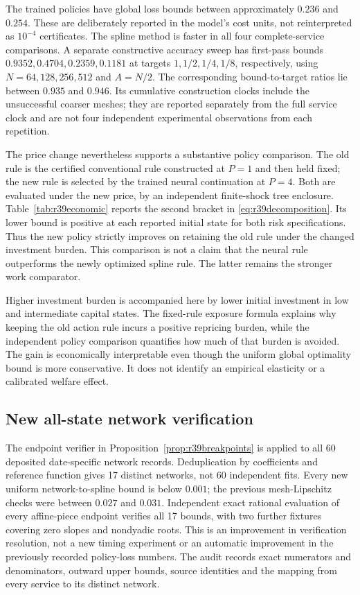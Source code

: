 

The trained policies have global loss bounds between approximately $0.236$ and
$0.254$. These are deliberately reported in the model's cost units, not
reinterpreted as $10^{-4}$ certificates. The spline method is faster in all
four complete-service comparisons. A separate constructive accuracy sweep
has first-pass bounds $0.9352,0.4704,0.2359,0.1181$ at targets
$1,1/2,1/4,1/8$, respectively, using $N=64,128,256,512$ and $A=N/2$.
The corresponding bound-to-target ratios lie between $0.935$ and $0.946$.
Its cumulative construction clocks include the unsuccessful coarser meshes;
they are reported separately from the full service clock and are not four
independent experimental observations from each repetition.

The price change nevertheless supports a substantive policy comparison.
The old rule is the certified conventional rule constructed at $P=1$ and then
held fixed; the new rule is selected by the trained neural continuation at
$P=4$. Both are evaluated under the new price, by an independent finite-shock
tree enclosure. Table~\ref{tab:r39economic} reports the second bracket in
\eqref{eq:r39decomposition}. Its lower bound is positive at each reported
initial state for both risk specifications. Thus the new policy strictly
improves on retaining the old rule under the changed investment burden.
This comparison is not a claim that the neural rule outperforms the newly
optimized spline rule. The latter remains the stronger work comparator.



Higher investment burden is accompanied here by lower initial investment in
low and intermediate capital states. The fixed-rule exposure formula explains
why keeping the old action rule incurs a positive repricing burden, while the
independent policy comparison quantifies how much of that burden is avoided.
The gain is economically interpretable even though the uniform global
optimality bound is more conservative. It does not identify an empirical
elasticity or a calibrated welfare effect.

\subsection{New all-state network verification}
The endpoint verifier in Proposition~\ref{prop:r39breakpoints} is applied to
all 60 deposited date-specific network records. Deduplication by coefficients
and reference function gives 17 distinct networks, not 60 independent fits.
Every new uniform network-to-spline bound is below $0.001$; the previous
mesh-Lipschitz checks were between $0.027$ and $0.031$. Independent exact
rational evaluation of every affine-piece endpoint verifies all 17 bounds,
with two further fixtures covering zero slopes and nondyadic roots.
This is an improvement in verification resolution, not a new timing experiment
or an automatic improvement in the previously recorded policy-loss numbers.
The audit records exact numerators and denominators, outward upper bounds,
source identities and the mapping from every service to its distinct network.

